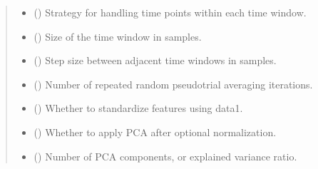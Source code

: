\documentclass[letterpaper,10pt,english]{sphinxhowto}
\begin{document}
\begin{fulllineitems}
\begin{quote}
\begin{description}
\begin{itemize}
\item {} 
\sphinxAtStartPar
{} (\sphinxstyleliteralemphasis{\sphinxupquote{, }}\sphinxstyleliteralemphasis{\sphinxupquote{, }}) \textendash{} Strategy for handling time points within each time window.

\item {} 
\sphinxAtStartPar
{} (\sphinxstyleliteralemphasis{\sphinxupquote{, }}) \textendash{} Size of the time window in samples.

\item {} 
\sphinxAtStartPar
{} (\sphinxstyleliteralemphasis{\sphinxupquote{, }}) \textendash{} Step size between adjacent time windows in samples.

\item {} 
\sphinxAtStartPar
{} (\sphinxstyleliteralemphasis{\sphinxupquote{, }}) \textendash{} Number of repeated random pseudo\sphinxhyphen{}trial averaging iterations.

\item {} 
\sphinxAtStartPar
{} (\sphinxstyleliteralemphasis{\sphinxupquote{, }}) \textendash{} Whether to standardize features using data1.

\item {} 
\sphinxAtStartPar
{} (\sphinxstyleliteralemphasis{\sphinxupquote{, }}) \textendash{} Whether to apply PCA after optional normalization.

\item {} 
\sphinxAtStartPar
{} (\sphinxstyleliteralemphasis{\sphinxupquote{, }}) \textendash{} Number of PCA components, or explained variance ratio.


\end{itemize}
\end{description}
\end{quote}
\end{fulllineitems}
\end{document}
